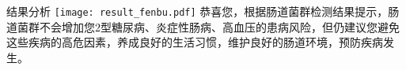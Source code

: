 \vspace*{3mm}
\begin{spacing}{1.25}
\begin{LRaside}[.8]{\fontsize{11pt}{11pt}\selectfont 结果分析}
\noindent
\texttt{[image: result\_fenbu.pdf]}
\asidebreak %
\fontsize{9.3pt}{11pt}\selectfont 恭喜您，根据肠道菌群检测结果提示，肠道菌群不会增加您2型糖尿病、炎症性肠病、高血压的患病风险，但仍建议您避免这些疾病的高危因素，养成良好的生活习惯，维护良好的肠道环境，预防疾病发生。
\end{LRaside}
\end{spacing}

\noindent\fontsize{7.5pt}{11pt}\selectfont {（注：本检测仅作为健康评估，不作为临床诊断，注意正常并不意味着无疾病发生的可能；高风险也不意味着一定发生此病。）}


